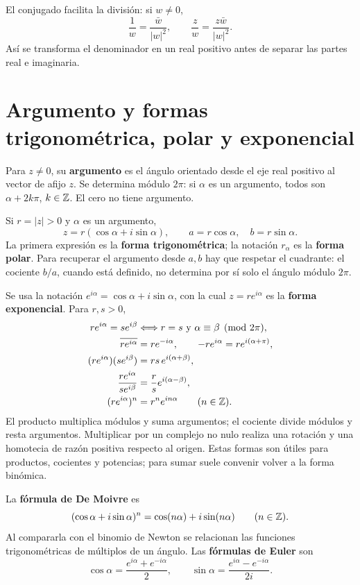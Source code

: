 El conjugado facilita la división: si $w\ne0$,
\[
 \frac1w=\frac{\bar w}{|w|^2},\qquad
 \frac zw=\frac{z\bar w}{|w|^2}.
\]
Así se transforma el denominador en un real positivo antes de separar
las partes real e imaginaria.

\section{Argumento y formas trigonométrica, polar y exponencial}
\label{sec:complejos-polar}
Para $z\ne0$, su \textbf{argumento} es el ángulo orientado desde el eje
real positivo al vector de afijo $z$. Se determina módulo $2\pi$:
si $\alpha$ es un argumento, todos son $\alpha+2k\pi$, $k\in\mathbb{Z}$.
El cero no tiene argumento.

Si $r=|z|>0$ y $\alpha$ es un argumento,
\[
 z=r(\cos\alpha+i\sin\alpha),\qquad
 a=r\cos\alpha,\quad b=r\sin\alpha.
\]
La primera expresión es la \textbf{forma trigonométrica}; la notación
$r_\alpha$ es la \textbf{forma polar}. Para recuperar el argumento desde
$a,b$ hay que respetar el cuadrante: el cociente $b/a$, cuando está
definido, no determina por sí solo el ángulo módulo $2\pi$.

Se usa la notación $e^{i\alpha}=\cos\alpha+i\sin\alpha$, con la cual
$z=re^{i\alpha}$ es la \textbf{forma exponencial}. Para $r,s>0$,
\begin{align*}
 re^{i\alpha}=se^{i\beta}&\eqv r=s\ \text{y}\ \alpha\equiv\beta\pmod{2\pi},\\
 \overline{re^{i\alpha}}&=re^{-i\alpha},\qquad
 -re^{i\alpha}=re^{i(\alpha+\pi)},\\
 (re^{i\alpha})(se^{i\beta})&=rs\,e^{i(\alpha+\beta)},\\
 \frac{re^{i\alpha}}{se^{i\beta}}&=\frac rs e^{i(\alpha-\beta)},\\
 (re^{i\alpha})^n&=r^ne^{in\alpha}\qquad(n\in\Z).
\end{align*}
El producto multiplica módulos y suma argumentos; el cociente divide
módulos y resta argumentos. Multiplicar por un complejo no nulo realiza
una rotación y una homotecia de razón positiva respecto al origen.
Estas formas son útiles para productos, cocientes y potencias; para
sumar suele convenir volver a la forma binómica.

La \textbf{fórmula de De Moivre} es
\[
 (\cos\alpha+i\sin\alpha)^n=\cos(n\alpha)+i\sin(n\alpha)
 \qquad(n\in\mathbb{Z}).
\]
Al compararla con el binomio de Newton se relacionan las funciones
trigonométricas de múltiplos de un ángulo. Las \textbf{fórmulas de Euler}
son
\[
 \cos\alpha=\frac{e^{i\alpha}+e^{-i\alpha}}2,\qquad
 \sin\alpha=\frac{e^{i\alpha}-e^{-i\alpha}}{2i}.
\]

